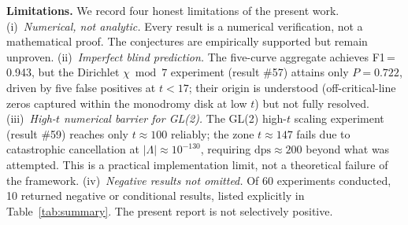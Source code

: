 \documentclass[11pt, a4paper]{article}
\theoremstyle{definition}
\theoremstyle{plain}
\begin{document}
\medskip\noindent
\textbf{Limitations.}\;
We record four honest limitations of the present work.
(i)~\emph{Numerical, not analytic.}
Every result is a numerical verification, not a mathematical proof.
The conjectures are empirically supported but remain unproven.
(ii)~\emph{Imperfect blind prediction.}
The five-curve aggregate achieves F1\,=\,0.943, but the Dirichlet
$\chi \bmod 7$ experiment (result \#57) attains only $P = 0.722$, driven by
five false positives at $t < 17$; their origin is understood
(off-critical-line zeros captured within the monodromy disk at low $t$) but
not fully resolved.
(iii)~\emph{High-$t$ numerical barrier for GL(2).}
The GL(2) high-$t$ scaling experiment (result \#59) reaches only
$t \approx 100$ reliably; the zone $t \approx 147$ fails due to
catastrophic cancellation at $|\Lambda| \approx 10^{-130}$, requiring
$\mathrm{dps} \approx 200$ beyond what was attempted.
This is a practical implementation limit, not a theoretical failure of the
framework.
(iv)~\emph{Negative results not omitted.}
Of 60 experiments conducted, 10 returned negative or conditional results,
listed explicitly in Table~\ref{tab:summary}.
The present report is not selectively positive.
\end{document}
